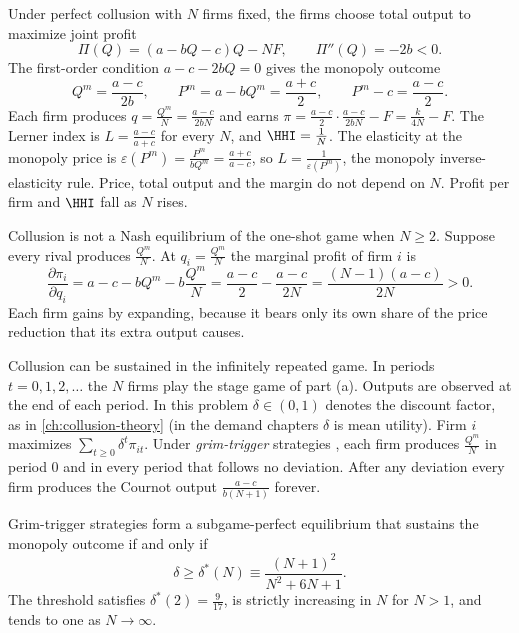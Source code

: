 Under perfect collusion with $N$ firms fixed, the firms choose total output to maximize joint profit
\begin{equation*}
\Pi(Q) = (a - bQ - c)Q - NF, \qquad \Pi''(Q) = -2b < 0 .
\end{equation*}
The first-order condition $a - c - 2bQ = 0$ gives the monopoly outcome
\begin{equation}\label{eq:C-monopoly}
Q^m = \frac{a - c}{2b}, \qquad P^m = a - bQ^m = \frac{a + c}{2}, \qquad P^m - c = \frac{a - c}{2}.
\end{equation}
Each firm produces $q = \frac{Q^m}{N} = \frac{a - c}{2bN}$ and earns $\pi = \frac{a - c}{2}\cdot\frac{a - c}{2bN} - F
= \frac{k}{4N} - F$. The Lerner index is $L = \frac{a - c}{a + c}$ for every $N$, and $\HHI = \frac{1}{N}$. The
elasticity at the monopoly price is $\varepsilon(P^m) = \frac{P^m}{bQ^m} = \frac{a + c}{a - c}$, so
$L = \frac{1}{\varepsilon(P^m)}$, the monopoly inverse-elasticity rule. Price, total output and the margin do not
depend on $N$. Profit per firm and $\HHI$ fall as $N$ rises.

Collusion is not a Nash equilibrium of the one-shot game when $N \ge 2$. Suppose every rival produces
$\frac{Q^m}{N}$. At $q_i = \frac{Q^m}{N}$ the marginal profit of firm $i$ is
\begin{equation*}
\frac{\partial \pi_i}{\partial q_i} = a - c - bQ^m - b\frac{Q^m}{N} = \frac{a - c}{2} - \frac{a - c}{2N}
= \frac{(N - 1)(a - c)}{2N} > 0 .
\end{equation*}
Each firm gains by expanding, because it bears only its own share of the price reduction that its extra
output causes.

Collusion can be sustained in the infinitely repeated game. In periods $t = 0, 1, 2, \dots$ the $N$ firms play
the stage game of part (a). Outputs are observed at the end of each period. In this problem $\delta \in (0, 1)$
denotes the discount factor, as in \cref{ch:collusion-theory} (in the demand chapters $\delta$ is mean utility).
Firm $i$ maximizes $\sum_{t \ge 0}\delta^t\pi_{it}$. Under \emph{grim-trigger} strategies \citep{Friedman1971}, each
firm produces $\frac{Q^m}{N}$ in period 0 and in every period that follows no deviation. After any deviation every
firm produces the Cournot output $\frac{a - c}{b(N + 1)}$ forever.

\begin{proposition}\label{prop:C-delta}
Grim-trigger strategies form a subgame-perfect equilibrium that sustains the monopoly outcome if and only if
\begin{equation}\label{eq:C-delta}
\delta \ge \delta^*(N) \equiv \frac{(N + 1)^2}{N^2 + 6N + 1}.
\end{equation}
The threshold satisfies $\delta^*(2) = \frac{9}{17}$, is strictly increasing in $N$ for $N > 1$, and
tends to one as $N \to \infty$.
\end{proposition}

